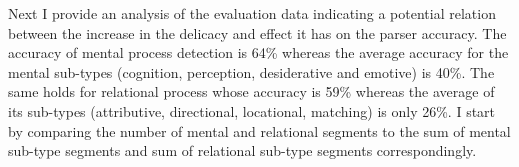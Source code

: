     Next I provide an analysis of the evaluation data indicating a potential relation between the increase in the delicacy and effect it has on the parser accuracy. The accuracy of mental process detection is 64\% whereas the average accuracy for the mental sub-types (cognition, perception, desiderative and emotive) is 40\%. The same holds for relational process whose accuracy is 59\% whereas the average of its sub-types (attributive, directional, locational, matching) is only 26\%. I start by comparing the number of mental and relational segments to the sum of mental sub-type segments and sum of relational sub-type segments correspondingly. 
    
   \begin{table}[!ht]
    \noindent
    \end{table}
    
